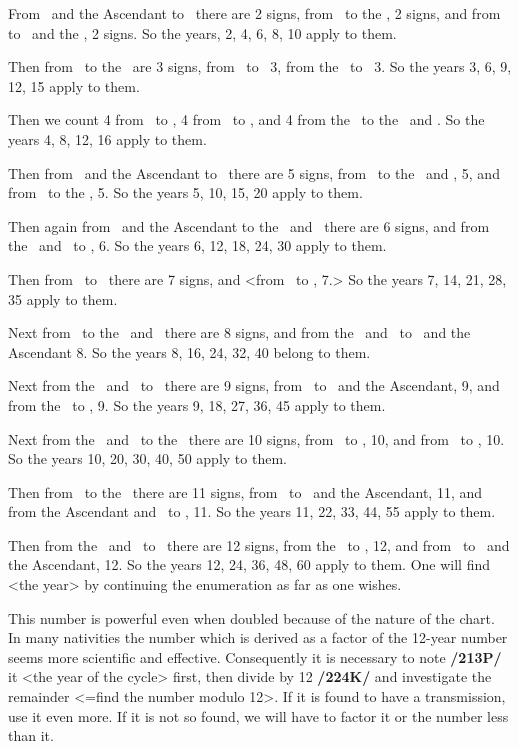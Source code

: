 From \Mars\, and the Ascendant to \Jupiter\, there are 2 signs, from \Jupiter\, to the \Moon, 2 signs, and from \Venus\, to \Mercury\, and the \Sun, 2 signs. So the years, 2, 4, 6, 8, 10 apply to them.

Then from \Mars\, to the \Moon\, are 3 signs, from \Saturn\, to \Mars\, 3, from the \Moon\, to \Venus\, 3. So the years 3, 6, 9, 12, 15 apply to them.

Then we count 4 from \Saturn\, to \Jupiter, 4 from \Jupiter\, to \Venus, and 4 from the \Moon\, to the \Sun\, and \Mercury. So the years 4, 8, 12, 16 apply to them.

Then from \Mars\, and the Ascendant to \Venus\, there are 5 signs, from \Jupiter\, to the \Sun\, and \Mercury, 5, and from \Saturn\, to the \Moon, 5. So the years 5, 10, 15, 20 apply to them.

Then again from \Mars\, and the Ascendant to the \Sun\, and \Mercury\, there are 6 signs, and from the \Sun\, and \Mercury\, to \Saturn, 6. So the years 6, 12, 18, 24, 30 apply to them.

Then from \Saturn\, to \Venus\, there are 7 signs, and <from \Venus\, to \Saturn, 7.> So the years 7, 14, 21, 28, 35 apply to them.

Next from \Saturn\, to the \Sun\, and \Mercury\, there are 8 signs, and from the \Sun\, and \Mercury\, to \Mars\, and the Ascendant 8. So the years 8, 16, 24, 32, 40 belong to them.

Next from the \Sun\, and \Mercury\, to \Jupiter\, there are 9 signs, from \Venus\, to \Mars\, and the Ascendant, 9, and from the \Moon\, to \Saturn, 9. So the years 9, 18, 27, 36, 45 apply to them.

Next from the \Sun\, and \Mercury\, to the \Moon\, there are 10 signs, from \Venus\, to \Jupiter, 10, and from \Jupiter\, to \Saturn, 10. So the years 10, 20, 30, 40, 50 apply to them.

Then from \Venus\, to the \Moon\, there are 11 signs, from \Moon\, to \Mars\, and the Ascendant, 11, and
from the Ascendant and \Mars\, to \Saturn, 11. So the years 11, 22, 33, 44, 55 apply to them.

Then from the \Sun\, and \Mercury\, to \Venus\, there are 12 signs, from the \Moon\, to \Jupiter, 12, and from \Jupiter\, to \Mars\, and the Ascendant, 12. So the years 12, 24, 36, 48, 60 apply to them. One will find <the year> by continuing the enumeration as far as one wishes.

This number is powerful even when doubled because of the nature of the chart. In many nativities the number which is derived as a factor of the 12-year number seems more scientific and effective. Consequently it is necessary to note \textbf{/213P/} it <the year of the cycle> first, then divide by 12 \textbf{/224K/} and investigate the remainder <=find the number modulo 12>. If it is found to have a transmission, use it even more. If it is not so found, we will have to factor it or the number less than it. 


